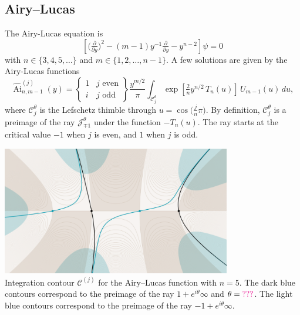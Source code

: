 \documentclass{article}
\DeclareMathOperator{\Ai}{Ai}
\theoremstyle{definition}
\theoremstyle{plain}
\begin{document}
\subsection{Airy--Lucas}\label{example_AL}
The Airy-Lucas equation is
\begin{equation}\label{eqn:airy-lucas}
\left[\big(\tfrac{\partial}{\partial y}\big)^2 - (m-1) y^{-1} \tfrac{\partial}{\partial y} - y^{n-2}\right] \psi = 0
\end{equation}
with $n \in \{3, 4, 5, \ldots\}$ and $m \in \{1, 2, \ldots, n-1\}$. A few solutions are given by the Airy-Lucas functions~\cite[equation~3.6]{charbonnier22}
\[ \widehat{\Ai}^{(j)}_{n, m-1}(y) = \left\{\begin{array}{ll}1 & j \text{ even} \\ i & j \text{ odd}\end{array}\right\} \frac{y^{m/2}}{\pi} \int_{\mathcal{C}^\theta_j} \exp\left[\tfrac{2}{n} y^{n/2}\,T_n(u)\right]\,U_{m-1}(u)\,du, \]
where $\mathcal{C}^\theta_j$ is the Lefschetz thimble through $u = \cos\big(\tfrac{j}{n}\pi\big)$. %
By definition, $\mathcal{C}^\theta_j$ is a preimage of the ray $\mathcal{J}^\theta_{\mp 1}$ under the function $-T_n(u)$. The ray starts at the critical value $-1$ when $j$ is even, and $1$ when $j$ is odd.
\begin{center}
\includegraphics[width=10cm]{figures/thimbles-n5.png} \\[1em]
{\small Integration contour $\mathcal{C}^{(j)}$ for the Airy--Lucas function with $n=5$. The dark blue contours correspond to the preimage of the ray $1+e^{i\theta}\infty$ and $\theta=\textcolor{magenta}{???}$. The light blue contours correspond to the preimage of the ray $-1+e^{i\theta}\infty$.}
\end{center}
\end{document}
